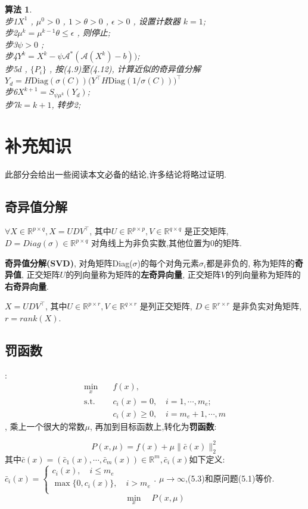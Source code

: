 \documentclass[UTF8]{ctexart}
\newtheorem{algo}{算法}
\newcommand{\s}{\quad}
\renewcommand{\b}{\textbf}
\newcommand{\p}{\paragraph{}\s}
\newcommand{\sect}{\section}
\newcommand{\ssect}{\subsection}
\newcommand{\equSplit}[1]{\begin{equation}\begin{split}#1\end{split}\end{equation}}
\newcommand{\equ}[1]{\begin{equation}#1\end{equation}}
\newcommand{\Tst}{\text{s.t.}\s}
\newcommand{\norm}[1]{\lVert#1\rVert}
\newcommand{\Real}[1]{\mathbb{R}^{#1}}
\numberwithin{equation}{section}
\begin{document}
				\begin{algo}
					\s\\
					步1 $X^1$ , $\mu^0 > 0$ , $1 > \theta > 0$ , $\epsilon > 0$ , 设置计数器 $k = 1$;\\
					步2 $\mu^k = \mu^{k -1} \theta \le \epsilon$ , 则停止;\\
					步3 $\psi > 0$ ;\\
					步4 $Y^k = X^k - \psi \mathcal{A}^*(\mathcal{A}(X^k) - b))$;\\
					步5 $d$ , $\{P_i\}$ , 按(4.9)至(4.12), 计算近似的奇异值分解 $Y_d = H \text{Diag}(\sigma(C)) \big(Y ^\top H \text{Diag}(1/\sigma(C))\big)^\top$\\
					步6 $X^{k+1} = S_{\psi \mu^k}(Y_d)$;\\
					步7\s$k = k + 1$, 转步2;
				\end{algo}
		


		
	\sect{补充知识}
		此部分会给出一些阅读本文必备的结论,许多结论将略过证明.
		\ssect{奇异值分解}
		$\forall X\in\Real{p\times q},X=UDV^\top$,
		其中$U\in\Real{p\times p},V\in\Real{q\times q}$
		是正交矩阵,
		$D=Diag(\sigma)\in\Real{p\times q}$
		对角线上为非负实数,其他位置为0的矩阵.

		\b{奇异值分解(SVD)},
		对角矩阵Diag($\sigma$)的每个对角元素$\sigma_i$都是非负的,
		称为矩阵的\b{奇异值},
		正交矩阵$U$的列向量称为矩阵的\b{左奇异向量},
		正交矩阵$V$的列向量称为矩阵的\b{右奇异向量}.

		$X=UDV^\top$,
		其中$U\in\Real{p\times r},V\in\Real{q\times r}$
		是列正交矩阵,
		$D\in\Real{r\times r}$
		是非负实对角矩阵,
		$r=rank(X)$.

		\ssect{罚函数}
		:
		\equSplit{
			\min_x\s&f(x),\\
			\Tst&c_i(x)=0,\s i=1,\cdots,m_e;\\
			&c_i(x)\geq 0,\s i=m_e+1,\cdots,m
		}
		,
		乘上一个很大的常数$\mu$,
		再加到目标函数上,转化为\b{罚函数}:

		\equ{P(x,\mu)=f(x)+\mu \norm{\bar{c}(x)}^2_2}
		其中$\bar{c}(x)=(\bar{c}_1(x),\cdots,\bar{c}_m(x))\in\Real{m}$,$\,\bar{c}_i(x)$如下定义:
		$\bar{c}_i(x)=
		\begin{cases}
			c_i(x),\s i\leq m_e       \\
			\max\{0,c_i(x)\},\s i>m_e \\
		\end{cases}
		$.
		$\mu\rightarrow\infty$,(5.3)和原问题(5.1)等价.
		\equ{\min_x\s P(x,\mu)}
\end{document}

